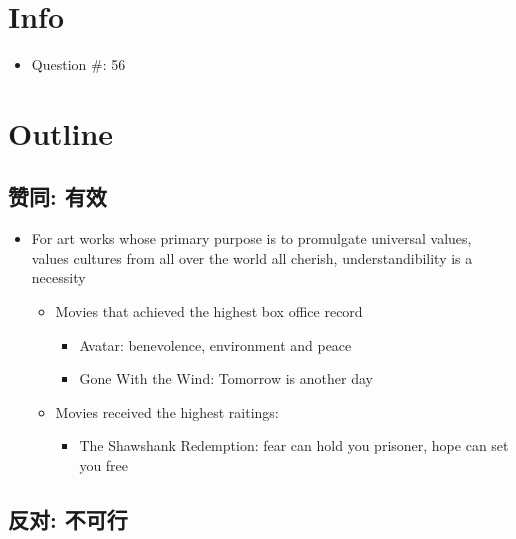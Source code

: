 \documentclass{article}
\begin{document}
  \section{Info}
    \begin{itemize}
      \item Question \#: 56
    \end{itemize}

  \section{Outline}

    \subsection{赞同: 有效}

      \begin{itemize}
        \item For art works whose primary purpose is to promulgate universal
        values, values cultures from all over the world all cherish,
        understandibility is a necessity
        \begin{itemize}
          \item Movies that achieved the highest box office record
          \begin{itemize}
            \item Avatar: benevolence, environment and peace
            \item Gone With the Wind: Tomorrow is another day
          \end{itemize}

          \item Movies received the highest raitings:
          \begin{itemize}
            \item The Shawshank Redemption: fear can hold you prisoner, hope
            can set you free
          \end{itemize}
        \end{itemize}
      \end{itemize}

    \subsection{反对: 不可行}
\end{document}
